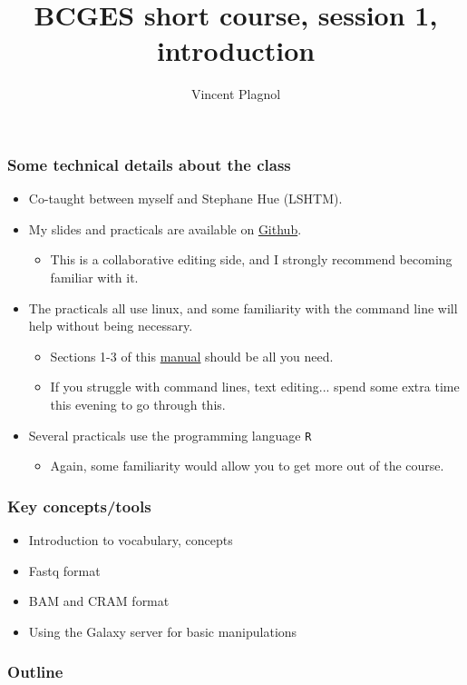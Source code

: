 \documentclass{beamer}
\title[]{BCGES short course, session 1, introduction}
\author[]{Vincent Plagnol}
\date{}
\institute{UCL Genetics Institute}
\begin{document}
\begin{frame}
  \titlepage
\end{frame}


\begin{frame}
  \frametitle{Some technical details about the class}
  \begin{itemize}
  \item Co-taught between myself and Stephane Hue (LSHTM).
  \item My slides and practicals are available on \href{https://github.com/vplagnol/BCGES_short_courses}{Github}.
    \begin{itemize}
    \item This is a collaborative editing side, and I strongly recommend becoming familiar with it.
    \end{itemize}
  \item The practicals all use linux, and some familiarity with the command line will help without being necessary.
    \begin{itemize}
      \item Sections 1-3 of this \href{http://linuxcommand.org/learning_the_shell.php}{manual} should be all you need.
      \item If you struggle with command lines, text editing... spend some extra time this evening to go through this.
    \end{itemize}
  \item Several practicals use the programming language \texttt{R}
    \begin{itemize}
    \item Again, some familiarity would allow you to get more out of the course.
    \end{itemize}
  \end{itemize}
\end{frame}


\begin{frame}
  \frametitle{Key concepts/tools}
  \begin{itemize}
  \item Introduction to vocabulary, concepts
  \item Fastq format
  \item BAM and CRAM format
  \item Using the Galaxy server for basic manipulations
  \end{itemize}
\end{frame}

\begin{frame}
  \frametitle{Outline}
  \tableofcontents
\end{frame}
\end{document}
